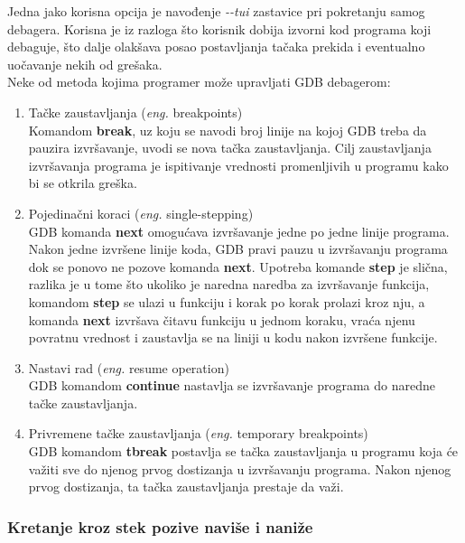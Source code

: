 \documentclass[a4paper]{article}
\begin{document}
Jedna jako korisna opcija je navođenje \textit{-\phantom{}-tui} zastavice pri pokretanju samog debagera. 
Korisna je iz razloga što korisnik dobija izvorni kod programa koji debaguje, što dalje olakšava posao postavljanja
tačaka prekida i eventualno uočavanje nekih od grešaka\cite{oReilly}.\\
Neke od metoda kojima programer može upravljati GDB debagerom:\cite{art_debugging}
\begin{enumerate}
\item Tačke zaustavljanja (\textit{eng.} breakpoints) \\
Komandom \textbf{break}, uz koju se navodi broj linije na kojoj GDB treba da pauzira izvršavanje, 
uvodi se nova tačka zaustavljanja. Cilj zaustavljanja izvršavanja programa je ispitivanje vrednosti
promenljivih u programu kako bi se otkrila greška.
\item Pojedinačni koraci (\textit{eng.} single-stepping)\\
GDB komanda \textbf{next} omogućava izvršavanje jedne po jedne linije programa. 
Nakon jedne izvršene linije koda, GDB pravi pauzu u izvršavanju programa dok se ponovo ne 
pozove komanda \textbf{next}. Upotreba komande \textbf{step} je slična, razlika je u tome što
ukoliko je naredna naredba za izvršavanje funkcija, 
komandom \textbf{step} se ulazi u funkciju i korak po korak prolazi kroz nju, a 
komanda \textbf{next} izvršava čitavu funkciju u jednom koraku, vraća njenu povratnu 
vrednost i zaustavlja se na liniji u kodu nakon izvršene funkcije.
\item Nastavi rad (\textit{eng.} resume operation)\\
GDB komandom \textbf{continue} nastavlja se izvršavanje programa do naredne tačke zaustavljanja. 
\item Privremene tačke zaustavljanja (\textit{eng.} temporary breakpoints)\\
GDB komandom \textbf{tbreak} postavlja se tačka zaustavljanja u programu koja će važiti 
sve do njenog prvog dostizanja u izvršavanju programa. Nakon njenog prvog dostizanja, 
ta tačka zaustavljanja prestaje da važi. 
\end{enumerate}

\subsubsection{Kretanje kroz stek pozive naviše i naniže}
\label{subsec:debager_stek}
\end{document}
